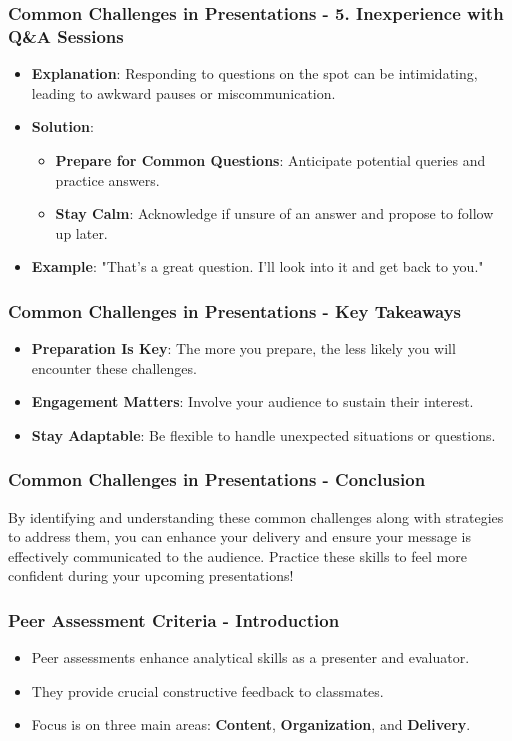 \documentclass[aspectratio=169]{beamer}
\begin{document}
\begin{frame}[fragile]
    \frametitle{Common Challenges in Presentations - 5. Inexperience with Q\&A Sessions}
    \begin{itemize}
        \item \textbf{Explanation}: Responding to questions on the spot can be intimidating, leading to awkward pauses or miscommunication.
        \item \textbf{Solution}: 
        \begin{itemize}
            \item \textbf{Prepare for Common Questions}: Anticipate potential queries and practice answers.
            \item \textbf{Stay Calm}: Acknowledge if unsure of an answer and propose to follow up later.
        \end{itemize}
        \item \textbf{Example}: "That's a great question. I’ll look into it and get back to you."
    \end{itemize}
\end{frame}

\begin{frame}[fragile]
    \frametitle{Common Challenges in Presentations - Key Takeaways}
    \begin{itemize}
        \item \textbf{Preparation Is Key}: The more you prepare, the less likely you will encounter these challenges.
        \item \textbf{Engagement Matters}: Involve your audience to sustain their interest.
        \item \textbf{Stay Adaptable}: Be flexible to handle unexpected situations or questions.
    \end{itemize}
\end{frame}

\begin{frame}[fragile]
    \frametitle{Common Challenges in Presentations - Conclusion}
    By identifying and understanding these common challenges along with strategies to address them, you can enhance your delivery and ensure your message is effectively communicated to the audience. Practice these skills to feel more confident during your upcoming presentations!
\end{frame}

\begin{frame}[fragile]
    \frametitle{Peer Assessment Criteria - Introduction}
    \begin{itemize}
        \item Peer assessments enhance analytical skills as a presenter and evaluator.
        \item They provide crucial constructive feedback to classmates.
        \item Focus is on three main areas: \textbf{Content}, \textbf{Organization}, and \textbf{Delivery}.
    \end{itemize}
\end{frame}
\end{document}
